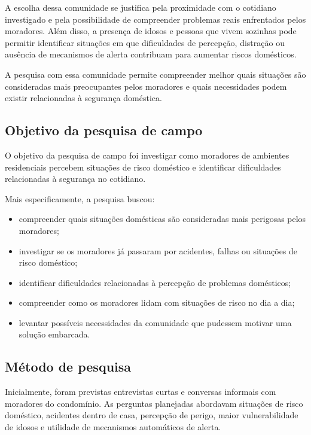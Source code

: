 \documentclass[11pt,a4paper]{article}
\numberwithin{equation}{section}
\begin{document}
A escolha dessa comunidade se justifica pela proximidade com o cotidiano investigado e pela
possibilidade de compreender problemas reais enfrentados pelos moradores. Além disso, a presença de
idosos e pessoas que vivem sozinhas pode permitir identificar situações em que dificuldades de
percepção, distração ou ausência de mecanismos de alerta contribuam para aumentar riscos domésticos.

A pesquisa com essa comunidade permite compreender melhor quais situações são consideradas mais
preocupantes pelos moradores e quais necessidades podem existir relacionadas à segurança doméstica.

\subsection{Objetivo da pesquisa de campo}

O objetivo da pesquisa de campo foi investigar como moradores de ambientes residenciais percebem
situações de risco doméstico e identificar dificuldades relacionadas à segurança no cotidiano.

Mais especificamente, a pesquisa buscou:

\begin{itemize}
  \item compreender quais situações domésticas são consideradas mais perigosas pelos moradores;
  \item investigar se os moradores já passaram por acidentes, falhas ou situações de risco doméstico;
  \item identificar dificuldades relacionadas à percepção de problemas domésticos;
  \item compreender como os moradores lidam com situações de risco no dia a dia;
  \item levantar possíveis necessidades da comunidade que pudessem motivar uma solução embarcada.
\end{itemize}

\subsection{Método de pesquisa}

Inicialmente, foram previstas entrevistas curtas e conversas informais com moradores do condomínio.
As perguntas planejadas abordavam situações de risco doméstico, acidentes dentro de casa, percepção de
perigo, maior vulnerabilidade de idosos e utilidade de mecanismos automáticos de alerta.
\end{document}
